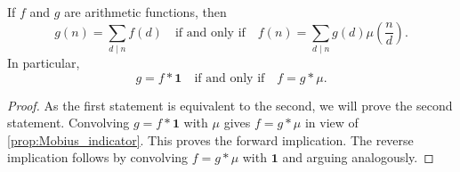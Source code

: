     \begin{theorem*}
      If \(f\) and \(g\) are arithmetic functions, then
      \[
        g(n) = \sum_{d \mid n}f(d) \quad \text{if and only if} \quad f(n) = \sum_{d \mid n}g(d)\mu\left(\frac{n}{d}\right).
      \]
      In particular,
      \[
        g = f \ast \mathbf{1} \quad \text{if and only if} \quad f = g \ast \mu.
      \]
    \end{theorem*}
    \begin{proof}
      As the first statement is equivalent to the second, we will prove the second statement. Convolving \(g = f \ast \mathbf{1}\) with \(\mu\) gives \(f = g \ast \mu\) in view of \cref{prop:Mobius_indicator}. This proves the forward implication. The reverse implication follows by convolving \(f = g \ast \mu\) with \(\mathbf{1}\) and arguing analogously.
    \end{proof}
